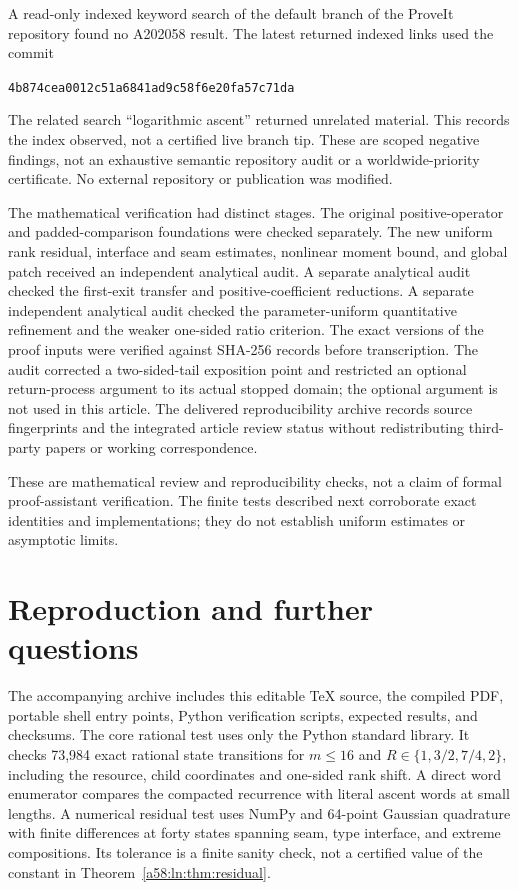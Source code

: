 \documentclass[11pt,letterpaper]{article}
\theoremstyle{remark}
\begin{document}
A read-only indexed keyword search of the default branch of the ProveIt
repository \cite{ProveIt} found no A202058 result. The latest returned
indexed links used the commit
\begin{center}\texttt{4b874cea0012c51a6841ad9c58f6e20fa57c71da}\end{center}
The related search
``logarithmic ascent'' returned unrelated material. This records the
index observed, not a certified live branch tip. These are scoped
negative findings, not an exhaustive semantic repository audit or a
worldwide-priority certificate. No external repository or publication
was modified.

The mathematical verification had distinct stages. The original
positive-operator and padded-comparison foundations were checked
separately. The new uniform rank residual, interface and seam estimates,
nonlinear moment bound, and global patch received an independent
analytical audit. A separate analytical audit checked the first-exit
transfer and positive-coefficient reductions. A separate independent analytical audit checked the parameter-uniform
quantitative refinement and the weaker one-sided ratio criterion. The exact versions of the
proof inputs were verified against SHA-256 records before transcription.
The audit corrected a two-sided-tail exposition point and restricted
an optional return-process argument to its actual stopped domain; the
optional argument is not used in this article. The delivered
reproducibility archive records source fingerprints and the integrated
article review status without redistributing third-party papers or
working correspondence.

These are mathematical review and reproducibility checks, not a claim
of formal proof-assistant verification. The finite tests described next
corroborate exact identities and implementations; they do not establish
uniform estimates or asymptotic limits.

\section{Reproduction and further questions}\label{a58:ln:sec:reproduce}
The accompanying archive includes this editable TeX source, the compiled
PDF, portable shell entry points, Python verification scripts, expected
results, and checksums. The core rational test uses only the Python
standard library. It checks 73,984 exact rational state transitions for
$m\le16$ and $R\in\{1,3/2,7/4,2\}$, including the resource, child
coordinates and one-sided rank shift. A direct word enumerator compares
the compacted recurrence with literal ascent words at small lengths.
A numerical residual test uses NumPy and 64-point Gaussian quadrature
with finite differences at forty states spanning seam, type interface,
and extreme compositions. Its tolerance is a finite sanity check, not
a certified value of the constant in Theorem~\ref{a58:ln:thm:residual}.
\end{document}
